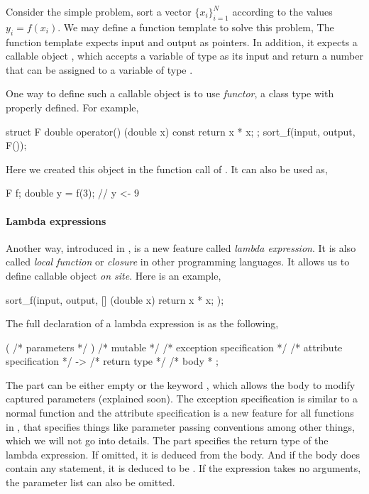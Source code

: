 Consider the simple problem, sort a vector $\{x_i\}_{i=1}^N$ according to the
values $y_i = f(x_i)$. We may define a function template to solve this
problem,
The function template  expects input and output as pointers.
In addition, it expects a callable object , which accepts a
variable of type  as its input and return a number that can
be assigned to a variable of type .

One way to define such a callable object is to use \emph{functor}, a class
type with  properly defined. For example,
\begin{cppcode}
struct F
{
    double operator() (double x) const { return x * x; }
};
sort_f(input, output, F());
\end{cppcode}
Here we created this object in the function call of . It can
also be used as,
\begin{cppcode}
F f;
double y = f(3); // y <- 9
\end{cppcode}

\paragraph{Lambda expressions}

Another way, introduced in \cppoo, is a new feature called \emph{lambda
  expression}. It is also called \emph{local function} or \emph{closure} in
other programming languages. It allows us to define callable object \emph{on
  site}. Here is an example,
\begin{cppcode}
sort_f(input, output, [] (double x) { return x * x; });
\end{cppcode}
The full declaration of a lambda expression is as the following,
\begin{cppcode}
[ /* capture */ ] ( /* parameters */ ) /* mutable */
/* exception specification */
/* attribute specification */
-> /* return type */ { /* body * };
\end{cppcode}
The  part can be either empty or the keyword
, which allows the body to modify captured parameters
(explained soon). The exception specification is similar to a normal function
and the attribute specification is a new feature for all functions in \cppoo,
that specifies things like parameter passing conventions among other things,
which we will not go into details. The part 
specifies the return type of the lambda expression. If omitted, it is deduced
from the body. And if the body does contain any  statement,
it is deduced to be . If the expression takes no arguments,
the parameter list can also be omitted.

